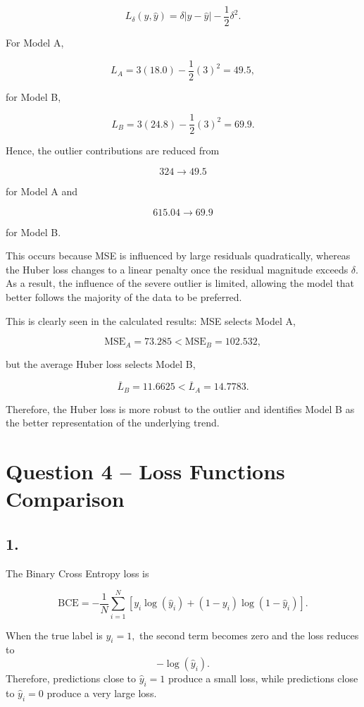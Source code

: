 \documentclass[11pt]{article}
\begin{document}
\[
L_\delta(y,\hat{y})
=
\delta|y-\hat{y}|-\frac{1}{2}\delta^2.
\]

For Model A,

\[
L_A
=
3(18.0)-\frac{1}{2}(3)^2 = 
49.5,
\]

for Model B,

\[
L_B
=
3(24.8)-\frac{1}{2}(3)^2 = 
69.9.
\]

Hence, the outlier contributions are reduced from

\[
324 \rightarrow 49.5
\]

for Model A and

\[
615.04 \rightarrow 69.9
\]

for Model B.

This occurs because MSE is influenced by large residuals quadratically,
whereas the Huber loss changes to a linear penalty once the residual
magnitude exceeds \(\delta\). As a result, the influence of the severe
outlier is limited, allowing the model that better follows the majority
of the data to be preferred.

This is clearly seen in the calculated results: MSE selects Model A,

\[
\mathrm{MSE}_A = 73.285
<
\mathrm{MSE}_B = 102.532,
\]

but the average Huber loss selects Model B,

\[
\overline{L}_B = 11.6625
<
\overline{L}_A = 14.7783.
\]

Therefore, the Huber loss is more robust to the outlier and identifies
Model B as the better representation of the underlying trend.

    \clearpage
    \section{Question 4 -- Loss Functions
Comparison}\label{question-4---loss-functions-comparison}

    \subsection{1.}

The Binary Cross Entropy loss is

\[
\mathrm{BCE}
=
-\frac{1}{N}
\sum_{i=1}^{N}
\left[
y_i\log(\hat{y}_i)
+
(1-y_i)\log(1-\hat{y}_i)
\right].
\]

When the true label is \(y_i=1,\) the second term becomes zero and the
loss reduces to \[-\log(\hat{y}_i).\] Therefore, predictions close to
\(\hat{y}_i=1\) produce a small loss, while predictions close to
\(\hat{y}_i=0\) produce a very large loss.
\end{document}
